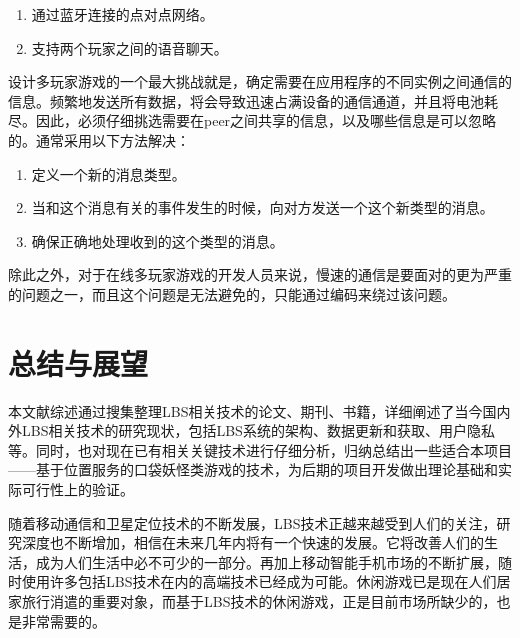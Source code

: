 \documentclass{article}
\begin{document}
\begin{CJK}{UTF8}{gbsn}
	\begin{enumerate}
		\item 通过蓝牙连接的点对点网络。
		\item 支持两个玩家之间的语音聊天。
	\end{enumerate}

  设计多玩家游戏的一个最大挑战就是，确定需要在应用程序的不同实例之间通信的信息。频繁地发送所有数据，将会导致迅速占满设备的通信通道，并且将电池耗尽。因此，必须仔细挑选需要在peer之间共享的信息，以及哪些信息是可以忽略的。通常采用以下方法解决：

	\begin{enumerate}
		\item 定义一个新的消息类型。
		\item 当和这个消息有关的事件发生的时候，向对方发送一个这个新类型的消息。
		\item 确保正确地处理收到的这个类型的消息。
  \end{enumerate}

  除此之外，对于在线多玩家游戏的开发人员来说，慢速的通信是要面对的更为严重的问题之一，而且这个问题是无法避免的，只能通过编码来绕过该问题。


	\section{总结与展望}
  本文献综述通过搜集整理LBS相关技术的论文、期刊、书籍，详细阐述了当今国内外LBS相关技术的研究现状，包括LBS系统的架构、数据更新和获取、用户隐私等。同时，也对现在已有相关关键技术进行仔细分析，归纳总结出一些适合本项目——基于位置服务的口袋妖怪类游戏的技术，为后期的项目开发做出理论基础和实际可行性上的验证。

  随着移动通信和卫星定位技术的不断发展，LBS技术正越来越受到人们的关注，研究深度也不断增加，相信在未来几年内将有一个快速的发展。它将改善人们的生活，成为人们生活中必不可少的一部分。再加上移动智能手机市场的不断扩展，随时使用许多包括LBS技术在内的高端技术已经成为可能。休闲游戏已是现在人们居家旅行消遣的重要对象，而基于LBS技术的休闲游戏，正是目前市场所缺少的，也是非常需要的。

	

	\end{CJK}
\end{document}
